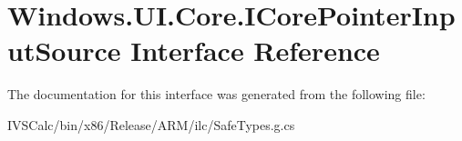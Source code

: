 \hypertarget{interface_windows_1_1_u_i_1_1_core_1_1_i_core_pointer_input_source}{}\section{Windows.\+U\+I.\+Core.\+I\+Core\+Pointer\+Input\+Source Interface Reference}
\label{interface_windows_1_1_u_i_1_1_core_1_1_i_core_pointer_input_source}


The documentation for this interface was generated from the following file\+:\begin{DoxyCompactItemize}
\item 
I\+V\+S\+Calc/bin/x86/\+Release/\+A\+R\+M/ilc/Safe\+Types.\+g.\+cs\end{DoxyCompactItemize}
